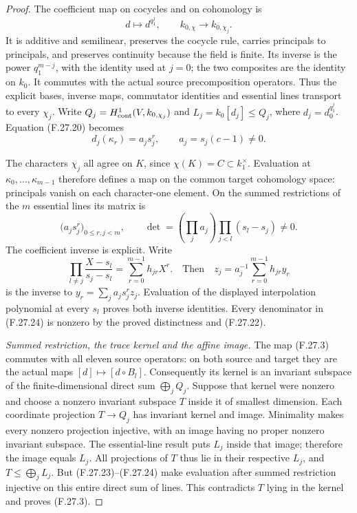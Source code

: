 \begin{proof}
The coefficient map on cocycles and on cohomology is
\[
                  d\longmapsto d^{q_1^j},
 \qquad k_{0,\chi}\longrightarrow k_{0,\chi_j}.
                                                               \tag{F.27.21}
\]
It is additive and semilinear, preserves the
cocycle rule, carries principals to principals,
and preserves continuity because the field is finite.
Its inverse is the power $q_1^{m-j}$, with the
identity used at $j=0$; the two composites are
the identity on $k_0$. It commutes with the actual
source precomposition operators. Thus the explicit
bases, inverse maps, commutator identities and
essential lines transport to every $\chi_j$.
Write $Q_j=H^1_{\rm cont}(V,k_{0,\chi_j})$ and
$L_j=k_0[d_j]\leq Q_j$, where $d_j=d_0^{q_1^j}$.
Equation (F.27.20) becomes
\[
              d_j(\kappa_r)=a_js_j^r,
                     \qquad a_j=s_j(c-1)\ne0.
                                                               \tag{F.27.22}
\]

The characters $\chi_j$ all agree on $K$, since
$\chi(K)=C\subset k_1^\times$. Evaluation at
$\kappa_0,\ldots,\kappa_{m-1}$ therefore defines
a map on the common target cohomology space:
principals vanish on each character-one element.
On the summed restrictions of the $m$ essential
lines its matrix is
\[
                  \bigl(a_js_j^r\bigr)_{
                        0\leq r,j<m},\qquad
 \det=\left(\prod_j a_j\right)
                   \prod_{j<l}(s_l-s_j)\ne0.
                                                               \tag{F.27.23}
\]
The coefficient inverse is explicit. Write
\[
 \prod_{l\ne j}\frac{X-s_l}{s_j-s_l}
       =\sum_{r=0}^{m-1}h_{jr}X^r.
 \quad\text{Then}\quad
       z_j=a_j^{-1}\sum_{r=0}^{m-1}h_{jr}y_r
                                                               \tag{F.27.24}
\]
is the inverse to
$y_r=\sum_j a_js_j^r z_j$.
Evaluation of the displayed interpolation polynomial
at every $s_l$ proves both inverse identities.
Every denominator in (F.27.24) is nonzero by
the proved distinctness and (F.27.22).

\emph{Summed restriction, the trace kernel and the affine image.}
The map (F.27.3) commutes with all eleven source
operators: on both source and target they are
the actual maps $[d]\mapsto[d\circ B_l]$.
Consequently its kernel is an invariant subspace
of the finite-dimensional direct sum $\bigoplus_jQ_j$.
Suppose that kernel were nonzero and choose a
nonzero invariant subspace $T$ inside it of
smallest dimension. Each coordinate projection
$T\to Q_j$ has invariant kernel and image.
Minimality makes every nonzero projection
injective, with an image having no proper
nonzero invariant subspace. The essential-line
result puts $L_j$ inside that image; therefore
the image equals $L_j$. All projections of $T$
thus lie in their respective $L_j$, and
$T\leq\bigoplus_jL_j$. But (F.27.23)--(F.27.24)
make evaluation after summed restriction injective
on this entire direct sum of lines. This
contradicts $T$ lying in the kernel and proves
(F.27.3).


\end{proof}
